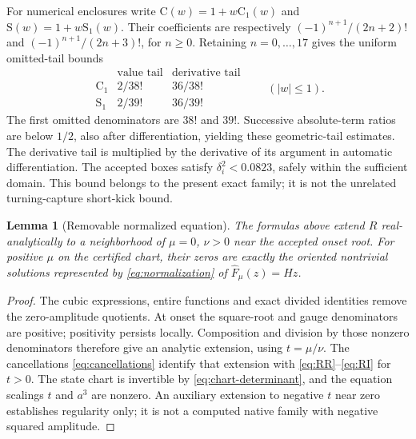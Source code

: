 \documentclass[11pt,a4paper]{article}
\numberwithin{equation}{section}
\newtheorem{lemma}[theorem]{Lemma}
\newcommand{\Fh}{\widehat F}\newcommand{\eps}{\varepsilon}
\newcommand{\entC}{\mathrm C}\newcommand{\entS}{\mathrm S}
\begin{document}
For numerical enclosures write $\entC(w)=1+w\entC_1(w)$ and $\entS(w)=1+w\entS_1(w)$. Their coefficients are respectively $(-1)^{n+1}/(2n+2)!$ and $(-1)^{n+1}/(2n+3)!$, for $n\ge0$. Retaining $n=0,\ldots,17$ gives the uniform omitted-tail bounds
\begin{equation}
\begin{array}{c|cc}
 & \text{value tail} & \text{derivative tail}\\\hline
\entC_1 & 2/38! & 36/38!\\
\entS_1 & 2/39! & 36/39!
\end{array}
\qquad(|w|\le1).\label{eq:tails}
\end{equation}
The first omitted denominators are $38!$ and $39!$. Successive absolute-term ratios are below $1/2$, also after differentiation, yielding these geometric-tail estimates. The derivative tail is multiplied by the derivative of its argument in automatic differentiation. The accepted boxes satisfy $\delta_i^2<0.0823$, safely within the sufficient domain. This bound belongs to the present exact family; it is not the unrelated turning-capture short-kick bound.

\begin{lemma}[Removable normalized equation]\label{lem:removable}
The formulas above extend $R$ real-analytically to a neighborhood of $\mu=0$, $\nu>0$ near the accepted onset root. For positive $\mu$ on the certified chart, their zeros are exactly the oriented nontrivial solutions represented by \eqref{eq:normalization} of $\Fh_\mu(z)=Hz$.
\end{lemma}
\begin{proof}
The cubic expressions, entire functions and exact divided identities remove the zero-amplitude quotients. At onset the square-root and gauge denominators are positive; positivity persists locally. Composition and division by those nonzero denominators therefore give an analytic extension, using $t=\mu/\nu$. The cancellations \eqref{eq:cancellations} identify that extension with \eqref{eq:RR}--\eqref{eq:RI} for $t>0$. The state chart is invertible by \eqref{eq:chart-determinant}, and the equation scalings $t$ and $a^3$ are nonzero. An auxiliary extension to negative $t$ near zero establishes regularity only; it is not a computed native family with negative squared amplitude.
\end{proof}
\end{document}
